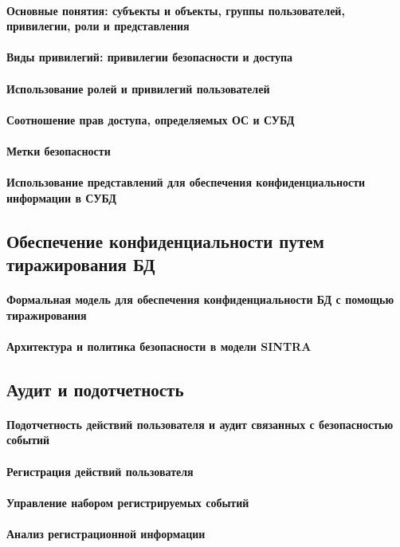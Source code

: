\paragraph{Основные понятия: субъекты и объекты, группы пользователей, привилегии, роли и представления}
\paragraph{Виды привилегий: привилегии безопасности и доступа}
\paragraph{Использование ролей и привилегий пользователей}
\paragraph{Соотношение прав доступа, определяемых ОС и СУБД}
\paragraph{Метки безопасности}
\paragraph{Использование представлений для обеспечения конфиденциальности информации в СУБД}

\subsection{Обеспечение конфиденциальности путем тиражирования БД}
\paragraph{Формальная модель для обеспечения конфиденциальности БД с помощью тиражирования}
\paragraph{Архитектура и политика безопасности в модели SINTRA}

\subsection{Аудит и подотчетность}
\paragraph{Подотчетность действий пользователя и аудит связанных с безопасностью событий}
\paragraph{Регистрация действий пользователя}
\paragraph{Управление набором регистрируемых событий}
\paragraph{Анализ регистрационной информации}
